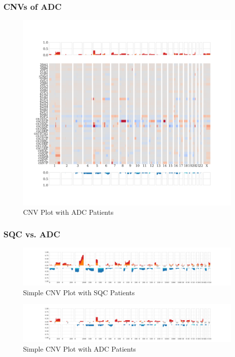 \documentclass{beamer}
\begin{document}
    \begin{frame}
        \frametitle{CNVs of ADC}

        \begin{figure}
            \includegraphics[height=0.7 \textheight]{figures/Sequenza/BWA-genome-ADC.pdf}
            \caption{CNV Plot with ADC Patients}
        \end{figure}
    \end{frame}

    \begin{frame}
        \frametitle{SQC vs. ADC}

        \begin{figure}
            \includegraphics[width=\linewidth]{figures/Sequenza/BWA-simple-SQC.pdf}
            \caption{Simple CNV Plot with SQC Patients}
        \end{figure}

        \begin{figure}
            \includegraphics[width=\linewidth]{figures/Sequenza/BWA-simple-ADC.pdf}
            \caption{Simple CNV Plot with ADC Patients}
        \end{figure}
    \end{frame}
\end{document}
